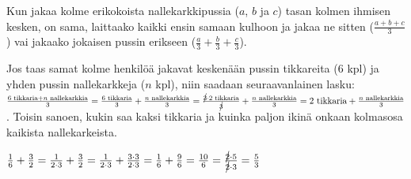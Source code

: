 Kun jakaa kolme erikokoista nallekarkkipussia ($a$, $b$ ja $c$) tasan kolmen ihmisen kesken, on sama, laittaako kaikki ensin samaan kulhoon ja jakaa ne sitten ($\frac{a+b+c}{3}$) vai jakaako jokaisen pussin erikseen ($ \frac{a}{3} + \frac{b}{3} + \frac{c}{3}$).

Jos taas samat kolme henkilöä jakavat keskenään pussin tikkareita ($6$ kpl) ja yhden pussin nallekarkkeja ($n$ kpl), niin saadaan seuraavanlainen lasku: $ \frac{6\text{ tikkaria}+n\text{ nallekarkkia}}{3} = \frac{6\text{ tikkaria}}{3} + \frac{n\text{ nallekarkkia}}{3} = \frac{\cancel{3} \cdot 2\text{ tikkaria}}{\cancel{3}} + \frac{n\text{ nallekarkkia}}{3} = 2\text{ tikkaria} + \frac{n\text{ nallekarkkia}}{3}$. Toisin sanoen, kukin saa kaksi tikkaria ja kuinka paljon ikinä onkaan kolmasosa kaikista nallekarkeista.



\begin{esimerkki}

$ \frac{1}{6} + \frac{3}{2} = \frac{1}{2\cdot 3} + \frac{3}{2} = \frac{1}{2 \cdot 3} + \frac{3 \cdot 3}{2 \cdot 3} = \frac{1}{6} + \frac{9}{6} = \frac{10}{6} = \frac{\cancel{2} \cdot 5}{\cancel{2} \cdot 3} = \frac{5}{3}$

\end{esimerkki}
